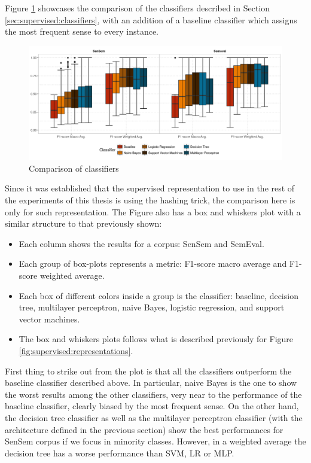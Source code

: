 Figure \ref{fig:supervised:classifiers} showcases the comparison of the
classifiers described in Section \ref{sec:supervised:classifiers}, with an
addition of a baseline classifier which assigns the most frequent sense to every
instance. 

\begin{figure}[ht]
	\includegraphics[width=\textwidth]{plots/supervised/classifier_comparison}
  \caption{Comparison of classifiers}
  \label{fig:supervised:classifiers}
\end{figure}

Since it was established that the supervised representation to use in the rest
of the experiments of this thesis is using the hashing trick, the comparison
here is only for such representation. The Figure also has a box and whiskers
plot with a similar structure to that previously shown:

\begin{itemize}
  \item Each column shows the results for a corpus: SenSem and SemEval.
  \item Each group of box-plots represents a metric: F1-score macro average and
    F1-score weighted average.
  \item Each box of different colors inside a group is the classifier:
    baseline, decision tree, multilayer perceptron, naive Bayes, logistic
    regression, and support vector machines.
  \item The box and whiskers plots follows what is described previously
    for Figure \ref{fig:supervised:representations}.
\end{itemize}

First thing to strike out from the plot is that all the classifiers outperform
the baseline classifier described above. In particular, naive Bayes is the one
to show the worst results among the other classifiers, very near to the
performance of the baseline classifier, clearly biased by the most frequent
sense. On the other hand, the decision tree classifier as well as the
multilayer perceptron classifier (with the architecture defined in the previous
section) show the best performances for SenSem corpus if we focus in minority
classes. However, in a weighted average the decision tree has a worse
performance than SVM, LR or MLP.

